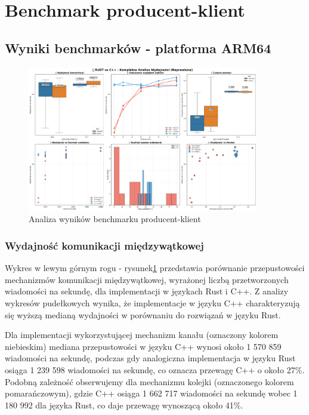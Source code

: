 \section{Benchmark producent-klient}

\subsection{Wyniki benchmarków - platforma ARM64}

\begin{figure}[H]
    \centering
    \includegraphics[width=0.9\textwidth]{analiza/images/conc/pc/arm/mega_overview_2x3.png}
    \caption{Analiza wyników benchmarku producent-klient}
    \label{analiza_benchmarku_producent_klient}
\end{figure}

\subsubsection{Wydajność komunikacji międzywątkowej}
Wykres w lewym górnym rogu - rysunek\ref{analiza_benchmarku_producent_klient} przedstawia porównanie przepustowości mechanizmów komunikacji międzywątkowej, wyrażonej liczbą przetworzonych wiadomości na sekundę, dla implementacji w językach Rust i C++. Z analizy wykresów pudełkowych wynika, że implementacje w języku C++ charakteryzują się wyższą medianą wydajności w porównaniu do rozwiązań w języku Rust.

Dla implementacji wykorzystującej mechanizm kanału (oznaczony kolorem niebieskim) mediana przepustowości w języku C++ wynosi około 1 570 859 wiadomości na sekundę, podczas gdy analogiczna implementacja w języku Rust osiąga 1 239 598 wiadomości na sekundę, co oznacza przewagę C++ o około 27\%. Podobną zależność obserwujemy dla mechanizmu kolejki (oznaczonego kolorem pomarańczowym), gdzie C++ osiąga 1 662 717 wiadomości na sekundę wobec 1 180 992 dla języka Rust, co daje przewagę wynoszącą około 41\%.

